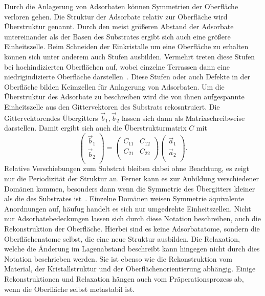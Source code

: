         Durch die Anlagerung von Adsorbaten können Symmetrien der Oberfläche verloren gehen.
        Die Struktur der Adsorbate relativ zur Oberfläche wird Überstruktur genannt.
        Durch den meist größeren Abstand der Adsorbate untereinander als der Basen des Substrates ergibt sich auch eine größere Einheitszelle.
        Beim Schneiden der Einkristalle um eine Oberfläche zu erhalten können sich unter anderem auch Stufen ausbilden.
        Vermehrt treten diese Stufen bei hochindizierten Oberflächen auf, wobei einzelne Terrassen dann eine niedrigindizierte Oberfläche darstellen~\cite{Fauster}.
        Diese Stufen oder auch Defekte in der Oberfläche bilden Keimzellen für Anlagerung von Adsorbaten.
        Um die Überstruktur des Adsorbate zu beschreiben wird die von ihnen aufgespannte Einheitszelle aus den Gittervektoren des Substrats rekosntruiert.
        Die Gittervektorendes Übergitters $\vec{b}_1, \vec{b}_2$ lassen sich dann als Matrixschreibweise darstellen.
        Damit ergibt sich auch die Überstrukturmatrix $C$ mit 
        \begin{equation}
            \begin{pmatrix}
                \vec{b}_1 \\
                \vec{b}_2 \\
            \end{pmatrix}
            = 
            \begin{pmatrix}
                C_{11} & C_{12} \\
                C_{21} & C_{22} \\
            \end{pmatrix}
            \begin{pmatrix}
                \vec{a}_1 \\
                \vec{a}_2 \\
            \end{pmatrix}.
        \end{equation}
        Relative Verschiebungen zum Substrat bleiben dabei ohne Beachtung, es zeigt nur die Periodizität der Struktur an.
        Ferner kann es zur Aubildung verschiedener Domänen kommen, besonders dann wenn die Symmetrie des Übergitters kleiner als die des Substrates ist~\cite{Fauster}.
        Einzelne Domänen weisen Symmetrie äquivalente Anordnungen auf, häufug handelt es sich nur umgedrehte Einheitszellen.
        Nicht nur Adsorbatebedeckungen lassen sich durch diese Notation beschreiben, auch die Rekonstruktion der Oberfläche.
        Hierbei sind es keine Adsorbatatome, sondern die Oberflächenatome selbst, die eine neue Struktur ausbilden.
        Die Relaxation, welche die Änderung im Lagenabstand beschreibt kann hingegen nicht durch dies Notation beschrieben werden.
        Sie ist ebenso wie die Rekonstruktion vom Material, der Kristallstruktur und der Oberflächenorientierung abhängig.
        Einige Rekonstruktionen und Relaxation hängen auch vom Präperationsprozess ab, wenn die Oberfläche selbst metastabil ist.

